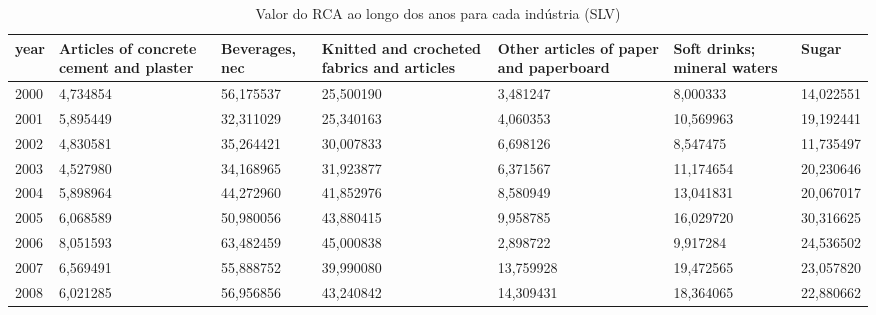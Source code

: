 \begin{table}
\centering
\caption{Valor do RCA ao longo dos anos para cada indústria (SLV)}
\begin{tabular}{p{1cm}p{2cm}p{2cm}p{2cm}p{2cm}p{2cm}p{2cm}}
\toprule
 year &  Articles of concrete cement and plaster &  Beverages, nec &  Knitted and crocheted fabrics and articles &  Other articles of paper and paperboard &  Soft drinks; mineral waters &     Sugar \\
\midrule
 2000 &                                 4,734854 &       56,175537 &                                   25,500190 &                                3,481247 &                     8,000333 & 14,022551 \\
 2001 &                                 5,895449 &       32,311029 &                                   25,340163 &                                4,060353 &                    10,569963 & 19,192441 \\
 2002 &                                 4,830581 &       35,264421 &                                   30,007833 &                                6,698126 &                     8,547475 & 11,735497 \\
 2003 &                                 4,527980 &       34,168965 &                                   31,923877 &                                6,371567 &                    11,174654 & 20,230646 \\
 2004 &                                 5,898964 &       44,272960 &                                   41,852976 &                                8,580949 &                    13,041831 & 20,067017 \\
 2005 &                                 6,068589 &       50,980056 &                                   43,880415 &                                9,958785 &                    16,029720 & 30,316625 \\
 2006 &                                 8,051593 &       63,482459 &                                   45,000838 &                                2,898722 &                     9,917284 & 24,536502 \\
 2007 &                                 6,569491 &       55,888752 &                                   39,990080 &                               13,759928 &                    19,472565 & 23,057820 \\
 2008 &                                 6,021285 &       56,956856 &                                   43,240842 &                               14,309431 &                    18,364065 & 22,880662 \\

\end{tabular}
\end{table}
